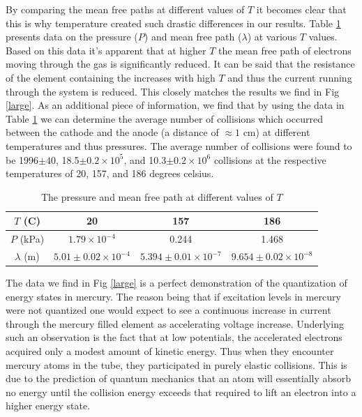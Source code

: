 \documentclass[prb,preprint]{revtex4-1}
\begin{document}
By comparing the mean free paths at different values of $T$ it becomes clear that this is why temperature created such drastic differences in our results. Table \ref{pres} presents data on the pressure ($P$) and mean free path ($\lambda$) at various $T$ values. Based on this data it's apparent that at higher $T$ the mean free path of electrons moving through the gas is significantly reduced. It can be said that the resistance of the element containing the increases with high $T$ and thus the current running through the system is reduced. This closely matches the results we find in Fig \ref{large}. As an additional piece of information, we find that by using the data in Table \ref{pres} we can determine the average number of collisions which occurred between the cathode and the anode (a distance of $\approx1$ cm) at different temperatures and thus pressures. The average number of collisions were found to be 1996$\pm40$, 18.5$\pm0.2\times10^5$, and 10.3$\pm0.2\times10^6$ collisions at the respective temperatures of 20, 157, and 186 degrees celsius.

\begin{table}[h]
\caption{The pressure and mean free path at different values of $T$}
\begin{ruledtabular}
\begin{tabular}{c c c c}
$T$ (C) & 20 & 157 & 186
\\
\hline
$P$ (kPa) & $1.79\times10^{-4}$   & 0.244   & 1.468\\
$\lambda$ (m) & $5.01\pm0.02\times10^{-4}$ & $5.394\pm0.01\times10^{-7}$ & $9.654\pm0.02\times10^{-8}$\\
\end{tabular}
\end{ruledtabular}
\label{pres}
\end{table}

The data we find in Fig \ref{large} is a perfect demonstration of the quantization of energy states in mercury. The reason being that if excitation levels in mercury were not quantized one would expect to see a continuous increase in current through the mercury filled element as accelerating voltage increase. Underlying such an observation is the fact that at low potentials, the accelerated electrons acquired only a modest amount of kinetic energy. Thus when they encounter mercury atoms in the tube, they participated in purely elastic collisions. This is due to the prediction of quantum mechanics that an atom will essentially absorb no energy until the collision energy exceeds that required to lift an electron into a higher energy state.
\end{document}
